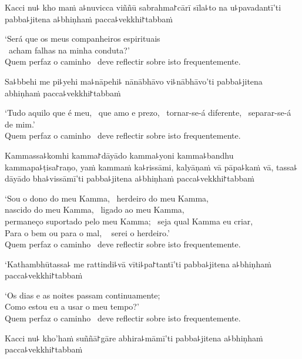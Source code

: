Kacci nu꜕ kho maṁ a꜕nuvicca viññū sabrahma꜓cārī sīla꜕to na u꜕pavadantī'ti pabba꜕jitena a꜕bhiṇhaṁ pacca꜕vekkhi꜓tabbaṁ

\begin{english}
  `Será que os meus companheiros espirituais \pause\\\
  acham falhas na minha conduta?' \pause\\
  Quem perfaz o caminho \pause\ deve reflectir sobre isto frequentemente.
\end{english}

Sa꜕bbehi me pi꜕yehi ma꜕nāpehi꜕ nānābhāvo vi꜕nābhāvo'ti pabba꜕jitena abhiṇhaṁ pacca꜕vekkhi꜓tabbaṁ

\begin{english}
  `Tudo aquilo que é meu, \pause\ que amo e prezo, \pause\ tornar-se-á diferente, \pause\ separar-se-á de mim.' \pause\\
  Quem perfaz o caminho \pause\ deve reflectir sobre isto frequentemente.
\end{english}

Kammassa꜕komhi kamma꜓dāyādo kamma꜕yoni kamma꜕bandhu kammapa꜕ṭisa꜓raṇo, yaṁ kammaṁ ka꜕rissāmi, kalyāṇaṁ vā pāpa꜕kaṁ vā, tassa꜕ dāyādo bha꜕vissāmī'ti pabba꜕jitena a꜕bhiṇhaṁ pacca꜕vekkhi꜓tabbaṁ

\begin{english}
  `Sou o dono do meu Kamma, \pause\ herdeiro do meu Kamma, \pause\\
  nascido do meu Kamma, \pause\ ligado ao meu Kamma, \pause\\
  permaneço suportado pelo meu Kamma; \pause\ seja qual Kamma eu criar, \pause\\
  Para o bem ou para o mal, \pause\ \prul{disso} serei o herdeiro.' \pause\\
  Quem perfaz o caminho \pause\ deve reflectir sobre isto frequentemente.
\end{english}

\clearpage

`Kathambhūtassa꜕ me rattindi꜕vā vīti꜕pa꜓tantī'ti pabba꜕jitena a꜕bhiṇhaṁ pacca꜕vekkhi꜓tabbaṁ

\begin{english}
  `Os dias e as noites passam continuamente; \pause\\
  Como estou eu a usar o meu tempo?' \pause\\
  Quem perfaz o caminho \pause\ deve reflectir sobre isto frequentemente.
\end{english}

Kacci nu꜕ kho'haṁ suññā꜓gāre abhira꜕māmī'ti pabba꜕jitena a꜕bhiṇhaṁ pacca꜕vekkhi꜓tabbaṁ

